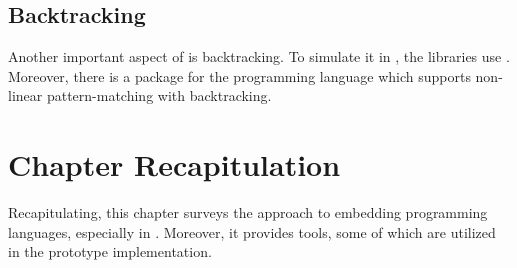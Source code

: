 \documentclass[thesis-solanki.tex]{subfiles}
\begin{document}
\subsection{Backtracking}

Another important aspect of  is backtracking.
To simulate it in , the libraries \cite{stream-monad-lib, logicst-lib} use .
Moreover, there is a package for the  programming language \cite{egison-lib} which supports
non-linear pattern-matching with backtracking.




\section{Chapter Recapitulation}
Recapitulating, this chapter surveys the approach to embedding programming languages, especially  in .
Moreover, it provides tools, some of which are utilized in the prototype implementation.   

\ifMain
\begin{scope}
  \nolinenumbers
  \enotesize
  \par
  \begin{singlespace}
  \setlength{\parskip}{12pt plus 2pt minus 1pt}
  \theendnotes
  \par
  \end{singlespace}
\end{scope}
\fi
\end{document}
